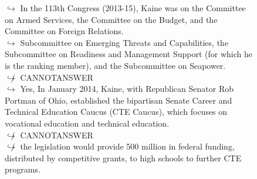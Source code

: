 \documentclass[11pt,a4paper, onecolumn]{article}
\begin{document}
\begin{figure}[t] \small \begin{tcolorbox}[boxsep=0pt,left=5pt,right=0pt,top=2pt,colback = yellow!5] \begin{dialogue}
 \small 
\colorbox{pink!25}{$\hookrightarrow$}
{ In the 113th Congress (2013-15), Kaine was on the Committee on Armed Services, the Committee on the Budget, and the Committee on Foreign Relations. }
\\
\colorbox{pink!25}{$\hookrightarrow$}
{ Subcommittee on Emerging Threats and Capabilities, the Subcommittee on Readiness and Management Support (for which he is the ranking member), and the Subcommittee on Seapower. }
\\
\colorbox{pink!25}{$\not\hookrightarrow$}
{ CANNOTANSWER }
\\
\colorbox{pink!25}{$\hookrightarrow$}
\colorbox{red!25}{Yes,}
{ In January 2014, Kaine, with Republican Senator Rob Portman of Ohio, established the bipartisan Senate Career and Technical Education Caucus (CTE Caucus), which focuses on vocational education and technical education. }
\\
\colorbox{pink!25}{$\not\hookrightarrow$}
{ CANNOTANSWER }
\\
\colorbox{pink!25}{$\not\hookrightarrow$}
{ the legislation would provide  500 million in federal funding, distributed by competitive grants, to high schools to further CTE programs. }
\\
 \end{dialogue}\end{tcolorbox}\end{figure}
\end{document}
